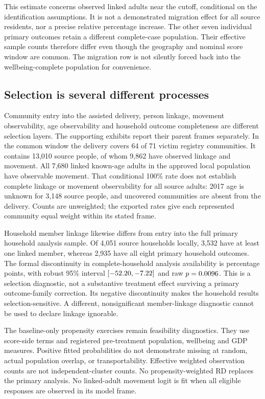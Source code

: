 This estimate concerns observed linked adults near the cutoff, conditional
on the identification assumptions. It is not a demonstrated migration effect
for all source residents, nor a precise relative percentage increase. The
other seven individual primary outcomes retain a different complete-case
population. Their effective sample counts therefore differ even though the
geography and nominal score window are common. The migration row is not
silently forced back into the wellbeing-complete population for convenience.

\subsection{Selection is several different processes}

Community entry into the assisted delivery, person linkage, movement
observability, age observability and household outcome completeness are
different selection layers. The supporting exhibits report their parent
frames separately. In the common window the delivery covers 64 of 71 victim
registry communities. It contains 13,010 source people, of whom 9,862 have
observed linkage and movement. All 7,680 linked known-age adults in the
approved local population have observable movement. That conditional 100\%
rate does not establish complete linkage or movement observability for all
source adults: 2017 age is unknown for 3,148 source people, and uncovered
communities are absent from the delivery. Counts are unweighted; the exported
rates give each represented community equal weight within its stated frame.

Household member linkage likewise differs from entry into the full primary
household analysis sample. Of 4,051 source households locally, 3,532 have at
least one linked member, whereas 2,935 have all eight primary household
outcomes. The formal discontinuity in complete-household analysis
availability is \HouseholdSelectionEffect{} percentage points, with robust
95\% interval \([-52.20{},-7.22{}]\)
and raw \(p=0.0096{}\). This is a selection diagnostic,
not a substantive treatment effect surviving a primary outcome-family
correction. Its negative discontinuity makes the household results
selection-sensitive. A different, nonsignificant member-linkage diagnostic
cannot be used to declare linkage ignorable.

The baseline-only propensity exercises remain feasibility diagnostics. They
use score-side terms and registered pre-treatment population, wellbeing and
GDP measures. Positive fitted probabilities do not demonstrate missing at
random, actual population overlap, or transportability. Effective weighted
observation counts are not independent-cluster counts. No propensity-weighted
RD replaces the primary analysis. No linked-adult movement logit is fit when
all eligible responses are observed in its model frame.

